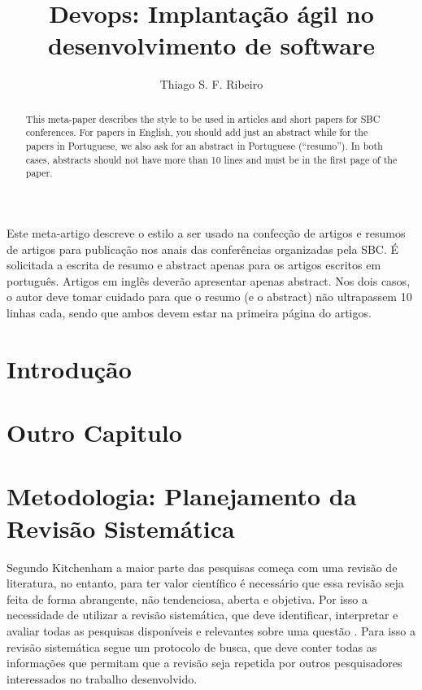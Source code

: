 \documentclass[12pt]{article}
\title{Devops: Implantação ágil no desenvolvimento de software}
\author{Thiago S. F. Ribeiro\inst{1}}
\begin{document}
\maketitle

\begin{abstract}
  This meta-paper describes the style to be used in articles and short papers
  for SBC conferences. For papers in English, you should add just an abstract
  while for the papers in Portuguese, we also ask for an abstract in
  Portuguese (``resumo''). In both cases, abstracts should not have more than
  10 lines and must be in the first page of the paper.
\end{abstract}

\begin{resumo}
  Este meta-artigo descreve o estilo a ser usado na confecção de artigos e
  resumos de artigos para publicação nos anais das conferências organizadas
  pela SBC. É solicitada a escrita de resumo e abstract apenas para os artigos
  escritos em português. Artigos em inglês deverão apresentar apenas abstract.
  Nos dois casos, o autor deve tomar cuidado para que o resumo (e o abstract)
  não ultrapassem 10 linhas cada, sendo que ambos devem estar na primeira
  página do artigos.
\end{resumo}

\section{Introdução}\label{sec1}

\section{Outro Capitulo} \label{sec2}

\section{Metodologia: Planejamento da Revisão Sistemática} \label{sec3}

Segundo Kitchenham \cite{kitchenham2004procedures} a maior parte das pesquisas começa com uma revisão de literatura, no entanto, para ter valor científico é necessário que essa revisão seja feita de forma abrangente, não tendenciosa, aberta e objetiva. Por isso a necessidade de utilizar a revisão sistemática, que deve identificar, interpretar e avaliar todas as pesquisas disponíveis e relevantes sobre uma questão \cite{keele2007guidelines}. Para isso a revisão sistemática segue um protocolo de busca, que deve conter todas as informações que permitam que a revisão seja repetida por outros pesquisadores interessados no trabalho desenvolvido.
\end{document}
